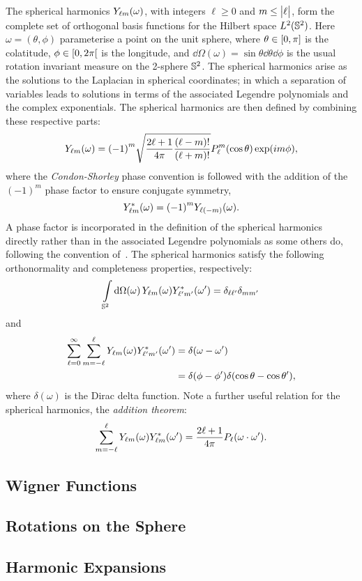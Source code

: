 The spherical harmonics \(\pixel{\harmonic{Y}}\), with integers \(\ell \geq 0\) and \(m \leq \abs{\ell}\), form the complete set of orthogonal basis functions for the Hilbert space \(\hilbert{\twoSphere}\).
Here \(\omega=(\theta,\phi)\) parameterise a point on the unit sphere, where \(\theta \in \interval{0}{\pi}\) is the colatitude, \(\phi \in \interval[open right]{0}{2\pi}\) is the longitude, and \(\dd{\Omega(\omega)} = \sin{\theta} \dd{\theta} \dd{\phi}\) is the usual rotation invariant measure on the 2-sphere \(\twoSphere\).
The spherical harmonics arise as the solutions to the Laplacian in spherical coordinates; in which a separation of variables leads to solutions in terms of the associated Legendre polynomials and the complex exponentials.
The spherical harmonics are then defined by combining these respective parts:
%
\begin{equation}
	\pixel{\harmonic{Y}}
	= {(-1)}^{m} \sqrt{\factor \frac{(\ell-m)!}{(\ell+m)!}} P^{m}_{\ell}(\cos{\theta}) \exp(i m\phi),
\end{equation}
%
where the \emph{Condon-Shorley} phase convention is followed with the addition of the \({(-1)}^{m}\) phase factor to ensure conjugate symmetry, \ie{}
%
\begin{equation}
    \pixel{\conj{\harmonic{Y}}}
    = {(-1)}^{m} \pixel{Y_{\ell(-m)}}.
\end{equation}
%
A phase factor is incorporated in the definition of the spherical harmonics directly rather than in the associated Legendre polynomials as some others do, following the convention of~\cite{Brink1993}.
The spherical harmonics satisfy the following orthonormality and completeness properties, respectively:
%
\begin{equation}
    \integrateSphere{\omega} \pixel{\harmonic{Y}} \pixel[']{\conj{\harmonic[']{Y}}}
    = \delta_{\ell\ell'} \delta_{mm'}
\end{equation}
%
and
%
\begin{align}
    \sum\limits_{\ell=0}^{\infty} \sum\limits_{m=-\ell}^{\ell} \pixel{\harmonic{Y}} \pixel[']{\conj{\harmonic[']{Y}}}
    &= \delta(\omega - \omega') \nonumber{} \\
    &= \delta(\phi - \phi') \delta(\cos{\theta} - \cos{\theta'}),
\end{align}
%
where \(\delta(\omega)\) is the Dirac delta function.
Note a further useful relation for the spherical harmonics, the \emph{addition theorem}:
%
\begin{equation}
	\sum\limits_{m=-\ell}^{\ell} \pixel{\harmonic{Y}} \pixel[']{\conj{\harmonic{Y}}}
	= \factor P_{\ell}(\omega \cdot \omega').
\end{equation}


\subsection{Wigner Functions}

\subsection{Rotations on the Sphere}

\subsection{Harmonic Expansions}
